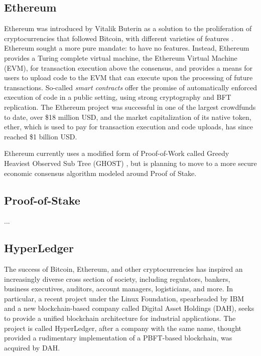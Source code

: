\subsection{Ethereum}

Ethereum was introduced by Vitalik Buterin as a solution to the proliferation of cryptocurrencies that followed Bitcoin,
with different varieties of features \cite{buterin2013ethereum}.
Ethereum sought a more pure mandate: to have no features.
Instead, Ethereum provides a Turing complete virtual machine, the Ethereum Virtual Machine (EVM), for transaction execution above the consensus,
and provides a means for users to upload code to the EVM that can execute upon the processing of future transactions.
So-called \emph{smart contracts} \cite{szabo1997formalizing} offer the promise of automatically enforced execution of code in a public setting, 
using strong cryptography and BFT replication. 
The Ethereum project was successful in one of the largest crowdfunds to date, over \$18 million USD, 
and the market capitalization of its native token, ether, which is used to pay for transaction execution and code uploads,
has since reached \$1 billion USD.

Ethereum currently uses a modified form of Proof-of-Work called Greedy Heaviest Observed Sub Tree (GHOST) \cite{ghost},
but is planning to move to a more secure economic consensus algorithm modeled around Proof of Stake.

\subsection{Proof-of-Stake}
...

\subsection{HyperLedger}

The success of Bitcoin, Ethereum, and other cryptocurrencies has inspired an increasingly diverse cross section of society,
including regulators, bankers, business executives, auditors, account managers, logisticians, and more.
In particular, a recent project under the Linux Foundation, spearheaded by IBM and a new blockchain-based company called Digital Asset Holdings (DAH), 
seeks to provide a unified blockchain architecture for industrial applications. The project is called HyperLedger,
after a company with the same name, thought provided a rudimentary implementation of a PBFT-based blockchain, was acquired by DAH.

